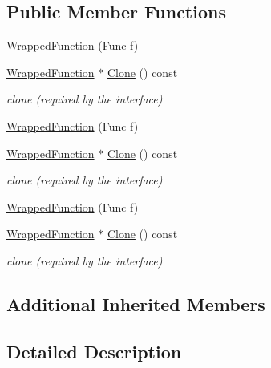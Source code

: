 \subsection*{Public Member Functions}
\begin{DoxyCompactItemize}
\item 
\mbox{\hyperlink{classROOT_1_1Math_1_1WrappedFunction_aa5dcde11a189a6fccb4262d341f31146}{Wrapped\+Function}} (Func f)
\item 
\mbox{\hyperlink{classROOT_1_1Math_1_1WrappedFunction}{Wrapped\+Function}} $\ast$ \mbox{\hyperlink{classROOT_1_1Math_1_1WrappedFunction_a4ec89f0c717b0fc228ebe7d71e14b1ee}{Clone}} () const
\begin{DoxyCompactList}\small\item\em clone (required by the interface) \end{DoxyCompactList}\item 
\mbox{\hyperlink{classROOT_1_1Math_1_1WrappedFunction_aa5dcde11a189a6fccb4262d341f31146}{Wrapped\+Function}} (Func f)
\item 
\mbox{\hyperlink{classROOT_1_1Math_1_1WrappedFunction}{Wrapped\+Function}} $\ast$ \mbox{\hyperlink{classROOT_1_1Math_1_1WrappedFunction_a4ec89f0c717b0fc228ebe7d71e14b1ee}{Clone}} () const
\begin{DoxyCompactList}\small\item\em clone (required by the interface) \end{DoxyCompactList}\item 
\mbox{\hyperlink{classROOT_1_1Math_1_1WrappedFunction_aa5dcde11a189a6fccb4262d341f31146}{Wrapped\+Function}} (Func f)
\item 
\mbox{\hyperlink{classROOT_1_1Math_1_1WrappedFunction}{Wrapped\+Function}} $\ast$ \mbox{\hyperlink{classROOT_1_1Math_1_1WrappedFunction_a4ec89f0c717b0fc228ebe7d71e14b1ee}{Clone}} () const
\begin{DoxyCompactList}\small\item\em clone (required by the interface) \end{DoxyCompactList}\end{DoxyCompactItemize}
\subsection*{Additional Inherited Members}


\subsection{Detailed Description}
